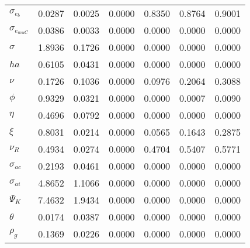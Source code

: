 \begin{center}
\begin{longtable}{lcccccc}
$ \sigma_{{e_b}}       $	 & 	          0.0287	 & 	          0.0025	 & 	          0.0000	 & 	          0.8350	 & 	          0.8764	 & 	          0.9001 \\ 
$ \sigma_{{e_{muC}}}   $	 & 	          0.0386	 & 	          0.0033	 & 	          0.0000	 & 	          0.0000	 & 	          0.0000	 & 	          0.0000 \\ 
$ {\sigma}             $	 & 	          1.8936	 & 	          0.1726	 & 	          0.0000	 & 	          0.0000	 & 	          0.0000	 & 	          0.0000 \\ 
$ {ha}                 $	 & 	          0.6105	 & 	          0.0431	 & 	          0.0000	 & 	          0.0000	 & 	          0.0000	 & 	          0.0000 \\ 
$ \nu                  $	 & 	          0.1726	 & 	          0.1036	 & 	          0.0000	 & 	          0.0976	 & 	          0.2064	 & 	          0.3088 \\ 
$ {\phi}               $	 & 	          0.9329	 & 	          0.0321	 & 	          0.0000	 & 	          0.0000	 & 	          0.0007	 & 	          0.0090 \\ 
$ {\eta}               $	 & 	          0.4696	 & 	          0.0792	 & 	          0.0000	 & 	          0.0000	 & 	          0.0000	 & 	          0.0000 \\ 
$ \xi                  $	 & 	          0.8031	 & 	          0.0214	 & 	          0.0000	 & 	          0.0565	 & 	          0.1643	 & 	          0.2875 \\ 
$ {\nu_R}              $	 & 	          0.4934	 & 	          0.0274	 & 	          0.0000	 & 	          0.4704	 & 	          0.5407	 & 	          0.5771 \\ 
$ {\sigma_{ac}}        $	 & 	          0.2193	 & 	          0.0461	 & 	          0.0000	 & 	          0.0000	 & 	          0.0000	 & 	          0.0000 \\ 
$ {\sigma_{ai}}        $	 & 	          4.8652	 & 	          1.1066	 & 	          0.0000	 & 	          0.0000	 & 	          0.0000	 & 	          0.0000 \\ 
$ {\Psi_{K}}           $	 & 	          7.4632	 & 	          1.9434	 & 	          0.0000	 & 	          0.0000	 & 	          0.0000	 & 	          0.0000 \\ 
$ {\theta}             $	 & 	          0.0174	 & 	          0.0387	 & 	          0.0000	 & 	          0.0000	 & 	          0.0000	 & 	          0.0000 \\ 
$ {\rho_g}             $	 & 	          0.1369	 & 	          0.0226	 & 	          0.0000	 & 	          0.0000	 & 	          0.0000	 & 	          0.0000 \\ 

\end{longtable}
\end{center}
